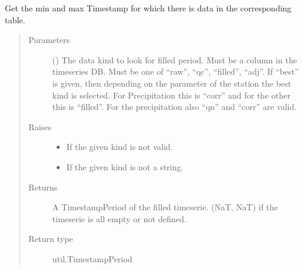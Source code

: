 \documentclass[letterpaper,10pt,english]{sphinxmanual}
\begin{document}
\begin{fulllineitems}
\begin{fulllineitems}
\label{\detokenize{weatherDB:weatherDB.station.StationBase.get_filled_period}}
\sphinxAtStartPar
Get the min and max Timestamp for which there is data in the corresponding table.
\begin{quote}\begin{description}
\item[{Parameters}] \leavevmode
\sphinxAtStartPar
{} () \textendash{} The data kind to look for filled period.
Must be a column in the timeseries DB.
Must be one of “raw”, “qc”, “filled”, “adj”.
If “best” is given, then depending on the parameter of the station the best kind is selected.
For Precipitation this is “corr” and for the other this is “filled”.
For the precipitation also “qn” and “corr” are valid.

\item[{Raises}] \leavevmode\begin{itemize}
\item {} 
\sphinxAtStartPar
{} \textendash{} If the given kind is not valid.

\item {} 
\sphinxAtStartPar
{} \textendash{} If the given kind is not a string.

\end{itemize}

\item[{Returns}] \leavevmode
\sphinxAtStartPar
A TimestampPeriod of the filled timeserie.
(NaT, NaT) if the timeserie is all empty or not defined.

\item[{Return type}] \leavevmode
\sphinxAtStartPar
util.TimestampPeriod

\end{description}\end{quote}

\end{fulllineitems}



\end{fulllineitems}
\end{document}

